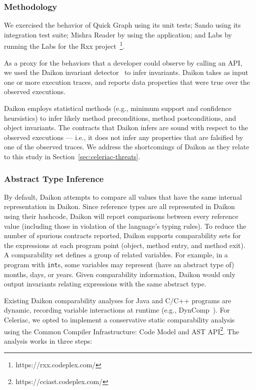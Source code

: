 \subsubsection{Methodology}

We exercised the behavior of Quick Graph using its unit tests; Sando
using its integration test suite; Mishra Reader by using the
application; and Labs by running the Labs for the Rxx
project~\footnote{https://rxx.codeplex.com/}.

As a proxy for the behaviors that a developer could observe by calling
an API, we used the Daikon invariant detector~\cite{daikon}
to infer invariants. Daikon takes as input one or more execution
traces, and reports data properties that were true over the observed
executions.

Daikon employs statistical methods (e.g., minimum support and
confidence heursistics) to infer likely method preconditions, method
postconditions, and object invariants.
%
The contracts that Daikon infers are sound with respect to the
observed executions --- i.e., it does not infer any properties that
are falsified by one of the observed traces.
%
We address the shortcomings of Daikon as they relate to this study in
Section~\ref{sec:celeriac-threats}.

\subsubsection{Abstract Type Inference}
\label{sec:comparability}

By default, Daikon attempts to compare all values that have the same
internal representation in Daikon. Since reference types are all
represented in Daikon using their hashcode, Daikon will report
comparisons between every reference value (including those in
violation of the language's typing rules).
%
To reduce the number of spurious contracts reported, Daikon supports
comparability sets for the expressions at each program point (object,
method entry, and method exit).
%
A comparability set defines a group of related variables. For example,
in a program with \verb|int|s, some variables may represent (have an
abstract type of) months, days, or years. Given comparability
information, Daikon would only output invariants relating expressions
with the same abstract type.

Existing Daikon comparability analyses for Java and C/C++ programs are
dynamic, recording variable interactions at runtime
(e.g., DynComp~). For Celeriac, we opted to implement a
conservative static comparability analysis using the Common Compiler
Infrastructure: Code Model and AST
API\footnote{https://cciast.codeplex.com/}. The analysis works in
three steps:

